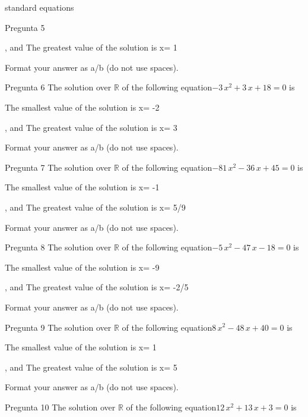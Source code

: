 \begin{quiz}{standard equations }
\begin{cloze}{Pregunta 5 }
\begin{shortanswer}, and  The greatest value of the solution is x=  1 \end{shortanswer}
Format your answer as a/b (do not use spaces).\end{cloze}\begin{cloze}{Pregunta 6 } The solution over $\mathbb{R}$ of the following equation$ -3\,x^2+3\,x+18=0  $ is 
\begin{shortanswer}The smallest value of the solution is x=  -2 \end{shortanswer}
\begin{shortanswer}, and  The greatest value of the solution is x=  3 \end{shortanswer}
Format your answer as a/b (do not use spaces).\end{cloze}\begin{cloze}{Pregunta 7 } The solution over $\mathbb{R}$ of the following equation$ -81\,x^2-36\,x+45=0  $ is 
\begin{shortanswer}The smallest value of the solution is x=  -1 \end{shortanswer}
\begin{shortanswer}, and  The greatest value of the solution is x=  5/9 \end{shortanswer}
Format your answer as a/b (do not use spaces).\end{cloze}\begin{cloze}{Pregunta 8 } The solution over $\mathbb{R}$ of the following equation$ -5\,x^2-47\,x-18=0  $ is 
\begin{shortanswer}The smallest value of the solution is x=  -9 \end{shortanswer}
\begin{shortanswer}, and  The greatest value of the solution is x=  -2/5 \end{shortanswer}
Format your answer as a/b (do not use spaces).\end{cloze}\begin{cloze}{Pregunta 9 } The solution over $\mathbb{R}$ of the following equation$ 8\,x^2-48\,x+40=0  $ is 
\begin{shortanswer}The smallest value of the solution is x=  1 \end{shortanswer}
\begin{shortanswer}, and  The greatest value of the solution is x=  5 \end{shortanswer}
Format your answer as a/b (do not use spaces).\end{cloze}\begin{cloze}{Pregunta 10 } The solution over $\mathbb{R}$ of the following equation$ 12\,x^2+13\,x+3=0  $ is 

\end{cloze}
\end{quiz}
